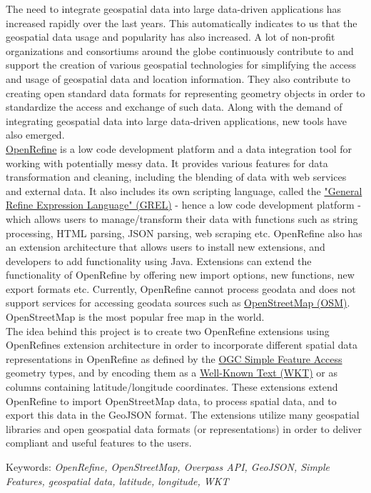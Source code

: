 The need to integrate geospatial data into large data-driven applications has increased
rapidly over the last years. This automatically indicates to us that the geospatial data usage and popularity has also increased. A lot of non-profit organizations and consortiums around the globe continuously contribute to and support the creation of various geospatial technologies for simplifying the access and usage of geospatial data and location information. They also contribute to creating open standard data formats for representing geometry objects in order to standardize the access and exchange of such data. Along with the demand of integrating geospatial data into large data-driven applications, new tools have also emerged.\\
\newline
\href{https://openrefine.org/}{OpenRefine} is a low code development platform and a data integration tool for working with potentially messy data.
It provides various features for data transformation and cleaning, including the blending of data with web services and external data. It also includes its own scripting language, called the \href{https://docs.openrefine.org/manual/grel}{"General Refine Expression Language" (GREL)} - hence a low code development platform - which allows users to manage/transform their data with functions such as string processing, HTML parsing, JSON parsing, web scraping etc. OpenRefine also has an extension architecture that allows users to install new extensions, and developers to add functionality using Java. Extensions can extend the functionality of OpenRefine by offering new import options, new functions, new export formats etc. Currently, OpenRefine cannot process geodata and does not support services for accessing geodata sources such as \href{https://www.openstreetmap.org/}{OpenStreetMap (OSM)}. OpenStreetMap is the most popular free map in the world.
\\
\newline
The idea behind this project is to create two OpenRefine extensions using OpenRefine\textquotesingle s extension architecture in order to incorporate
different spatial data representations in OpenRefine as defined by the \href{https://www.ogc.org/standards/sfa}{OGC Simple Feature Access} geometry types, and by encoding them as a \href{https://www.ogc.org/standards/wkt-crs}{Well-Known Text (WKT)} or as columns containing latitude/longitude coordinates. These extensions extend OpenRefine to import OpenStreetMap data, to process spatial data, and to export this data in the GeoJSON format. The extensions utilize many geospatial libraries and open geospatial data formats (or representations) in order to deliver compliant and useful features to the users.\\
\newline

Keywords: \textit{OpenRefine, OpenStreetMap, Overpass API, GeoJSON, Simple Features, geospatial data, latitude, longitude, WKT}